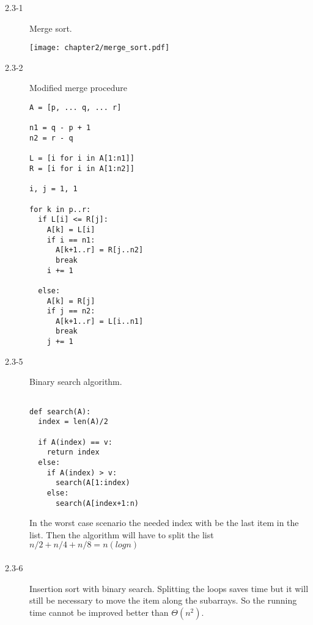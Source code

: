 \begin{description}
 \item[2.3-1] Merge sort.
 \begin{center}
 \texttt{[image: chapter2/merge\_sort.pdf]}
 \end{center}

\item[2.3-2] Modified merge procedure
\begin{lstlisting}
A = [p, ... q, ... r]

n1 = q - p + 1
n2 = r - q

L = [i for i in A[1:n1]]
R = [i for i in A[1:n2]]

i, j = 1, 1

for k in p..r:
  if L[i] <= R[j]:
    A[k] = L[i]
    if i == n1:
      A[k+1..r] = R[j..n2]
      break
    i += 1

  else:
    A[k] = R[j]
    if j == n2:
      A[k+1..r] = L[i..n1]
      break
    j += 1
\end{lstlisting}


\item[2.3-5] Binary search algorithm.
\begin{lstlisting}

def search(A):
  index = len(A)/2
  
  if A(index) == v:
    return index
  else:
    if A(index) > v:
      search(A[1:index)
    else:
      search(A[index+1:n)
\end{lstlisting}
In the worst case scenario the needed index with be the last item in the list. Then the
algorithm will have to split the list $n/2 + n/4 + n/8 = n(logn)\dfrac{}{}$


\item[2.3-6] Insertion sort with binary search. Splitting the loops saves time but it will still be necessary
to move the item along the subarrays. So the running time cannot be improved better than $\Theta(n^2)$.

\end{description}


